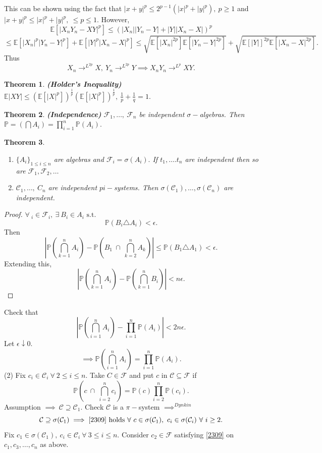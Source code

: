 \documentclass{article}
\newcommand{\1}{\mathds{1}}
\newcommand{\E}{\mathbb{E}}
\newcommand{\F}{\mathcal{F}}
\newcommand{\PB}{\mathbb{P}}
\newcommand{\lf}{\left}
\newcommand{\rg}{\right}
\newcommand{\f}[2]{\frac{#1}{#2}}
\newcommand{\C}{\mathcal{C}}
\newcommand{\st}{\text{ s.t. }}
\newcommand{\fb}[1]{\lf(#1\rg)}
\newcommand{\card}[1]{\lf\vert #1\rg\vert}
\def\beqn#1{\begin{equation}#1\end{equation}}
\newtheorem{theorem}{Theorem}[section]
\begin{document}
This can be shown using the fact that $\card{x+y}^p\leq 2^{p-1}(\card{x}^p+\card{y}^p),\ p\geq 1$ and $\card{x+y}^p\leq \card{x}^p+\card{y}^p,\ \leq p\leq 1.$ However,
$$\E[\card{X_nY_n-XY}^p]\leq (\card{X_n}\card{Y_n-Y}+\card{Y}\card{X_n-X})^p$$ $$\leq \E[\card{X_n}^p\card{Y_n-Y}^p]+\E[\card{Y}^p\card{X_n-X}^p]\leq \sqrt{\E[\card{X_n}^{2p}]\E[\card{Y_n-Y}^{2p}]}+\sqrt{\E[\card{Y}]^{2p}\E[\card{X_n-X}^{2p}]}.$$ Thus $$X_n\to^{L^{2p}} X,\ Y_n\to^{L^{2p}}Y\implies X_nY_n\to^{L^p} XY.$$
\begin{theorem}\textbf{(Holder's Inequality)}
    $\E\card{XY}\leq (\E[\card{X}^p])^{\f 1p}(\E[\card{X}^p])^{\f 1p},\ \f 1p+\f 1q=1.$
\end{theorem}
\begin{theorem}\textbf{(Independence)}
    $\F_1,\ldots,\ \F_n$ be independent $\sigma-$algebras. Then $\PB=(\bigcap A_i)=\prod_{i=1}^n \PB(A_i).$ 
\end{theorem}
\begin{theorem}
    \begin{enumerate}
        \item $\{A_i\}_{1\leq i\leq n}$ are algebras and $\F_i=\sigma(A_i).$ If $t_1,\ldots. t_n$ are independent then so are $\F_1,\F_2,\ldots$
        \item $\C_1,\ldots,\ C_n$ are independent $pi-$systems. Then $\sigma(\C_1),\ldots,\sigma(\C_n)$ are independent.
    \end{enumerate}
\end{theorem}
\begin{proof}
    $\forall\ _i\in\F_i,\ \exists\ B_i\in A_i\st$$$\PB(B_i\triangle A_i)<\epsilon.$$ Then $$\card{\PB\fb{\bigcap_{k=1}^n A_i}-\PB\fb{B_1\ \cap\ \bigcap_{k=2}^n A_k}}\leq \PB(B_1\triangle A_1)<\epsilon.$$ Extending this, $$\card{\PB\fb{\bigcap_{k=1}^n A_i}-\PB\fb{\bigcap_{k=1}^n B_i}}<n\epsilon.$$ 
\end{proof}
Check that $$\card{\PB\fb{\bigcap_{i=1}^n A_i}-\prod_{i=1}^n \PB(A_i)}<2n\epsilon.$$ Let $\epsilon\downarrow 0.$$$\implies \PB\fb{\bigcap_{i=1}^n A_i}=\prod_{i=1}^n \PB(A_i).$$
(2) Fix $c_i\in\C_i\ \forall\ 2\leq i\leq n.$ Take $C\in\F$ and put $c$ in $\C\subseteq\F$ if \beqn{\PB\fb{c\ \cap\ \bigcap_{i=2}^n c_i}=\PB(c)\prod_{i=2}^n\PB(c_i).\label{2309}} Assumption $\implies\ \C\supseteq \C_1.$ Check $\C$ is a $\pi-$system $\implies^{Dynkin}$ $$\C\supseteq \sigma(\C_1)\implies\eqref{2309}\text{ holds }\forall\ c\in\sigma(\C_1),\ c_i\in\sigma(\C_i)\ \forall\ i\geq 2.$$
Fix $c_1\in\sigma(\C_1),\ c_i\in\C_i\ \forall\ 3\leq i\leq n.$ Consider $c_2\in\F$ satisfying \eqref{2309} on $c_1,c_3,\ldots,c_n$ as above. 
\end{document}

